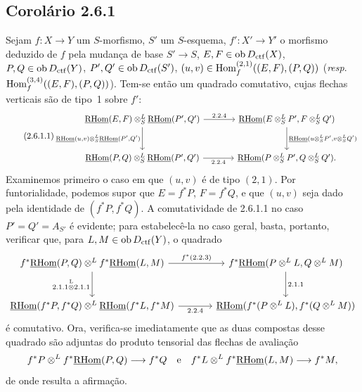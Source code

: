 \subsection*{Corolário 2.6.1}
Sejam $f:X\to Y$ um $S$-morfismo, $S'$ um $S$-esquema, $f':X'\to Y'$ o morfismo deduzido de $f$ pela mudança de base $S'\to S$, $E,F\in\operatorname{ob} D_{\mathrm{ctf}}(X)$, $P,Q\in\operatorname{ob} D_{\mathrm{ctf}}(Y)$, $P',Q'\in\operatorname{ob} D_{\mathrm{ctf}}(S')$, $(u,v)\in\operatorname{Hom}_f^{(2,1)}((E,F),(P,Q))$ (\emph{resp}. $\operatorname{Hom}_f^{(3,4)}((E,F),(P,Q))$). Tem-se então um quadrado comutativo, cujas flechas verticais são de tipo~1 sobre $f'$:
\begin{equation}\tag{2.6.1.1}
\begin{tikzcd}[column sep=large,row sep=large]
\uRHom(E,F)\otimes^L_S\uRHom(P',Q') \arrow[r,"2.2.4"] \arrow[d,"{\uRHom(u,v)\otimes^L_S\uRHom(P',Q')}"'] & \uRHom(E\otimes^L_SP',F\otimes^L_SQ') \arrow[d,"{\uRHom(u\otimes^L_SP',v\otimes^L_SQ')}"]\\
\uRHom(P,Q)\otimes^L_S\uRHom(P',Q') \arrow[r,"2.2.4"'] & \uRHom(P\otimes^L_SP',Q\otimes^L_SQ').
\end{tikzcd}
\end{equation}
Examinemos primeiro o caso em que $(u,v)$ é de tipo $(2,1)$. Por funtorialidade, podemos supor que $E=f^{*}P$, $F=f^{*}Q$, e que $(u,v)$ seja dado pela identidade de $(f^{*}P,f^{*}Q)$. A comutatividade de 2.6.1.1 no caso $P'=Q'=A_{S'}$ é evidente; para estabelecê-la no caso geral, basta, portanto, verificar que, para $L,M\in\operatorname{ob} D_{\mathrm{ctf}}(Y)$, o quadrado
\[
\begin{tikzcd}[column sep=large,row sep=large]
f^{*}\uRHom(P,Q)\otimes^L f^{*}\uRHom(L,M) \arrow[r,"{f^*(2.2.3)}"] \arrow[d,"{2.1.1\overset{\mathrm L}{\otimes} 2.1.1}"'] & f^{*}\uRHom(P\otimes^LL,Q\otimes^LM) \arrow[d,"2.1.1"]\\
\uRHom(f^{*}P,f^{*}Q)\otimes^L\uRHom(f^{*}L,f^{*}M) \arrow[r,"2.2.4"'] & \uRHom(f^{*}(P\otimes^LL),f^{*}(Q\otimes^LM))
\end{tikzcd}
\]
é comutativo. Ora, verifica-se imediatamente que as duas compostas desse quadrado são adjuntas do produto tensorial das flechas de avaliação
\[
f^{*}P\otimes^L f^{*}\underline{\mathrm{RHom}}(P,Q)\longrightarrow f^{*}Q
\quad\text{e}\quad
f^{*}L\otimes^L f^{*}\underline{\mathrm{RHom}}(L,M)\longrightarrow f^{*}M,
\]
de onde resulta a afirmação.

